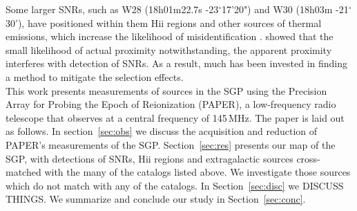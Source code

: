 \documentclass[useAMS,usenatbib]{mn2e}
\begin{document}
Some larger SNRs, such as W28 (18h01m22.7s -23$^{\circ}$17'20") and W30 (18h03m -21$^{\circ}$30'), have positioned within them H{\sc ii} regions and other sources of thermal emissions, which increase the likelihood of misidentification \citep{Andrews.85}. \cite{Brogan.06} showed that the small likelihood of actual proximity notwithstanding, the apparent proximity interferes with detection of SNRs.  As a result, much has been invested in finding a method to mitigate the selection effects.\\



This work presents measurements of sources in the SGP using the Precision Array for Probing the Epoch of Reionization (PAPER), a low-frequency radio telescope that observes at a central frequency of 145\,MHz. The paper is laid out as follows. In section~\ref{sec:obs} we discuss the acquisition and reduction of PAPER's measurements of the SGP. Section~\ref{sec:res} presents our map of the SGP, with detections of SNRs, H{\sc ii} regions and extragalactic sources cross-matched with the many of the catalogs listed above. We investigate those sources which do not match with any of the catalogs. In Section~\ref{sec:disc} we {\color{red} DISCUSS THINGS}. We summarize and conclude our study in Section~\ref{sec:conc}.%
\end{document}
